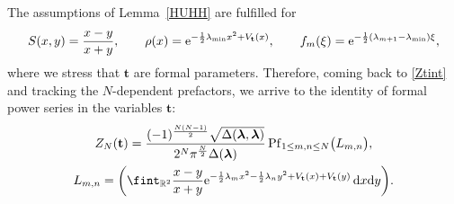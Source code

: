\documentclass[10pt,a4paper]{amsart}
\numberwithin{equation}{section}
\newcommand{\dd}{\mathrm{d}}
\begin{document}
The assumptions of Lemma~\ref{HUHH} are fulfilled for
\[
S(x,y) = \frac{x - y}{x + y},\qquad \rho(x) = {\rm e}^{-\frac{1}{2}\lambda_{\min} x^2 + V_{\mathbf{t}}(x)},\qquad f_m(\xi) = {\rm e}^{-\frac{1}{2}(\lambda_{m+1} - \lambda_{\min})\xi},
\]
where we stress that $\mathbf{t}$ are formal parameters. Therefore, coming back to \eqref{Ztint} and tracking the $N$-dependent prefactors, we arrive to the identity of formal power series in the variables $\mathbf{t}$:
\begin{gather*}
Z_N(\mathbf{t}) = \frac{(-1)^{\frac{N(N - 1)}{2}} \sqrt{\Delta(\boldsymbol{\lambda},\boldsymbol{\lambda})}}{2^N \pi^{\frac{N}{2}} \Delta(\boldsymbol{\lambda})} \operatorname{Pf}_{1 \leq m,n \leq N} \bigl(L_{m,n}\bigr), \\
L_{m,n} = \biggl(\fint_{\mathbb{R}^2} \frac{x - y}{x + y} {\rm e}^{-\frac{1}{2}\lambda_m x^2 - \frac{1}{2}\lambda_n y^2 + V_{\mathbf{t}}(x) + V_{\mathbf{t}}(y)} \,\dd x \dd y\biggr).%
\end{gather*}
\end{document}
